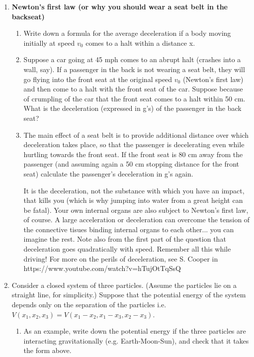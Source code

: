 \documentclass[fleqn]{article}
\begin{document}
\begin{enumerate}
\begin{enumerate}
    \end{enumerate}
    
    \item \textbf{Newton’s first law (or why you should wear a seat belt in the backseat)}
    \begin{enumerate}
      \item Write down a formula for the average deceleration if a body moving initially at speed $v_0$ comes to a halt within a distance x.
      \item Suppose a car going at 45 mph comes to an abrupt halt (crashes into a wall, say). If a passenger in the back is not wearing a seat
      belt, they will go flying into the front seat at the original speed $v_0$ (Newton’s first law) and then come to a halt with the front
      seat of the car. Suppose because of crumpling of the car that the front seat comes to a halt within 50 cm. What is the deceleration
      (expressed in g’s) of the passenger in the back seat?

      \item The main effect of a seat belt is to provide additional distance
      over which deceleration takes place, so that the passenger is decelerating even while hurtling towards the front seat. If the front
      seat is 80 cm away from the passenger (and assuming again a 50 cm stopping distance for the front seat) calculate the passenger’s
      deceleration in g’s again.

      It is the deceleration, not the substance with which you have an impact,
      that kills you (which is why jumping into water from a great height can
      be fatal). Your own internal organs are also subject to Newton’s first
      law, of course. A large acceleration or deceleration can overcome the
      tension of the connective tisues binding internal organs to each other...
      you can imagine the rest. Note also from the first part of the question
      that deceleration goes quadratically with speed. Remember all this
      while driving!
      For more on the perils of deceleration, see S. Cooper in
      https://www.youtube.com/watch?v=hTujOtTqSsQ

    \end{enumerate}

    \item Consider a closed system of three particles. (Assume the particles
    lie on a straight line, for simplicity.) Suppose that the potential energy of the system depends only on the separation of the particles i.e.
    $V(x_1, x_2, x_3)=V(x_1-x_2, x_1-x_3, x_2-x_3)$.
    \begin{enumerate}
      \item  As an example, write down the potential energy if the three particles are interacting gravitationally (e.g. Earth-Moon-Sun), and
      check that it takes the form above.


\end{enumerate}
\end{enumerate}
\end{document}
